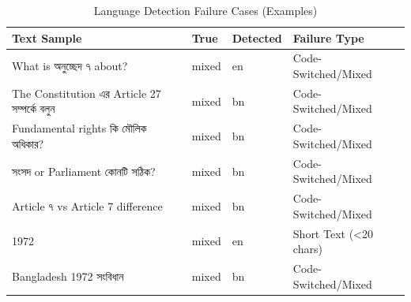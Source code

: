 \begin{table}[htbp]
\centering
\caption{Language Detection Failure Cases (Examples)}
\label{tab:language_failures}
\begin{tabular}{p{}lll}
\toprule
Text Sample & True & Detected & Failure Type \\
\midrule
What is অনুচ্ছেদ ৭ about? & mixed & en & Code-Switched/Mixed \\
The Constitution এর Article 27 সম্পর্কে বলুন & mixed & bn & Code-Switched/Mixed \\
Fundamental rights কি মৌলিক অধিকার? & mixed & bn & Code-Switched/Mixed \\
সংসদ or Parliament কোনটি সঠিক? & mixed & bn & Code-Switched/Mixed \\
Article ৭ vs Article 7 difference & mixed & bn & Code-Switched/Mixed \\
1972 & mixed & en & Short Text (<20 chars) \\
Bangladesh 1972 সংবিধান & mixed & bn & Code-Switched/Mixed \\
\bottomrule
\end{tabular}
\end{table}

